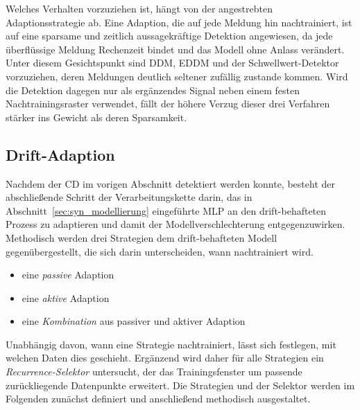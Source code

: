 %
Welches Verhalten vorzuziehen ist, hängt von der angestrebten Adaptionsstrategie ab. Eine Adaption, die auf jede Meldung hin nachtrainiert, ist auf eine sparsame und zeitlich aussagekräftige Detektion angewiesen, da jede überflüssige Meldung Rechenzeit bindet und das Modell ohne Anlass verändert. Unter diesem Gesichtspunkt sind \ac{DDM}, \ac{EDDM} und der Schwellwert-Detektor vorzuziehen, deren Meldungen deutlich seltener zufällig zustande kommen. Wird die Detektion dagegen nur als ergänzendes Signal neben einem festen Nachtrainingsraster verwendet, fällt der höhere Verzug dieser drei Verfahren stärker ins Gewicht als deren Sparsamkeit. \par
%
\subsection{Drift-Adaption} \label{sec:datensynthese_drift_adaption}
%

%
Nachdem der \ac{CD} im vorigen Abschnitt detektiert werden konnte, besteht der abschließende Schritt der Verarbeitungskette darin, das in Abschnitt~\ref{sec:syn_modellierung} eingeführte \ac{MLP} an den drift-behafteten Prozess zu adaptieren und damit der Modellverschlechterung entgegenzuwirken. Methodisch werden drei Strategien dem drift-behafteten Modell gegenübergestellt, die sich darin unterscheiden, wann nachtrainiert wird.
%
\begin{itemize}
    \item eine \emph{passive} Adaption
    \item eine \emph{aktive} Adaption
    \item eine \emph{Kombination} aus passiver und aktiver Adaption
\end{itemize}
%
Unabhängig davon, wann eine Strategie nachtrainiert, lässt sich festlegen, mit welchen Daten dies geschieht. Ergänzend wird daher für alle Strategien ein \emph{Recurrence-Selektor} untersucht, der das Trainingsfenster um passende zurückliegende Datenpunkte erweitert. Die Strategien und der Selektor werden im Folgenden zunächst definiert und anschließend methodisch ausgestaltet. \par
%
